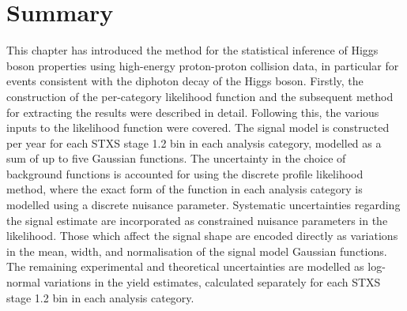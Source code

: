 \section{Summary}
This chapter has introduced the method for the statistical inference of Higgs boson properties using high-energy proton-proton collision data, in particular for events consistent with the diphoton decay of the Higgs boson. Firstly, the construction of the per-category likelihood function and the subsequent method for extracting the results were described in detail. Following this, the various inputs to the likelihood function were covered. The signal model is constructed per year for each STXS stage 1.2 bin in each analysis category, modelled as a sum of up to five Gaussian functions. The uncertainty in the choice of background functions is accounted for using the discrete profile likelihood method, where the exact form of the function in each analysis category is modelled using a discrete nuisance parameter. Systematic uncertainties regarding the signal estimate are incorporated as constrained nuisance parameters in the likelihood. Those which affect the signal shape are encoded directly as variations in the mean, width, and normalisation of the signal model Gaussian functions. The remaining experimental and theoretical uncertainties are modelled as log-normal variations in the yield estimates, calculated separately for each STXS stage 1.2 bin in each analysis category.
